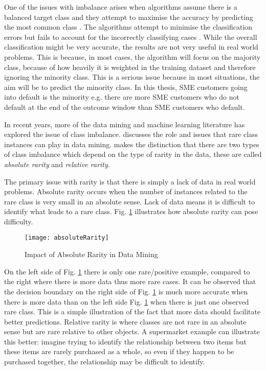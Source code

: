 One of the issues with imbalance arises when algorithms assume there is a balanced target class and they attempt to maximise the accuracy by predicting the most common class \citep{drummond_severe_2005}. The algorithms attempt to minimise the classification errors but fails to account for the incorrectly classifying cases \citep{seiffert_improving_2009}. While the overall classification might be very accurate, the results are not very useful in real world problems. This is because, in most cases, the algorithm will focus on the majority class, because of how heavily it is weighted in the training dataset and therefore ignoring the minority class. This is a serious issue because in most situations, the aim will be to predict the minority class. In this thesis, SME customers going into default is the minority e.g. there are more SME customers who do not default at the end of the outcome window than SME customers who default.

In recent years, more of the data mining and machine learning literature has explored the issue of class imbalance. \cite{weiss_mining_2004} discusses the role and issues that rare class instances can play in data mining. \cite{weiss_mining_2004} makes the distinction that there are two types of class imbalance which depend on the type of rarity in the data, these are called \textit{absolute rarity} and \textit{relative rarity}.

The primary issue with rarity is that there is simply a lack of data in real world problems. Absolute rarity occurs when the number of instances related to the rare class is very small in an absolute sense. Lack of data means it is difficult to identify what leads to a rare class. Fig. \ref{fig:absoluteRarity} illustrates how absolute rarity can pose difficulty.

\begin{figure}[H]
	\texttt{[image: absoluteRarity]}
	\caption{
		Impact of Absolute Rarity in Data Mining \\ \cite[Source:][]{weiss_mining_2004}
	}
	\label{fig:absoluteRarity}
\end{figure}

On the left side of Fig. \ref{fig:absoluteRarity} there is only one rare/positive example, compared to the right where there is more data thus more rare cases. It can be observed that the decision boundary on the right side of Fig. \ref{fig:absoluteRarity} is much more accurate when there is more data than on the left side Fig. \ref{fig:absoluteRarity} when there is just one observed rare class. This is a simple illustration of the fact that more data should facilitate better predictions. Relative rarity is where classes are not rare in an absolute sense but are rare relative to other objects. A supermarket example can illustrate this better: imagine trying to identify the relationship between two items but these items are rarely purchased as a whole, so even if they happen to be purchased together, the relationship may be difficult to identify.

